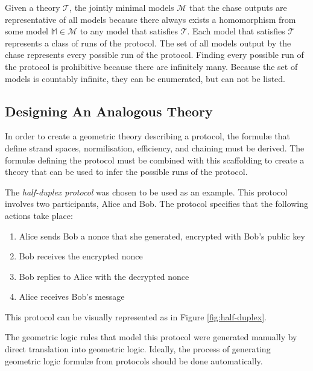 		Given a theory $\mathcal{T}$, the jointly minimal models $\mathcal{M}$
		that the chase outputs are representative of all models because there
		always exists a homomorphism from some model $\mathbb{M} \in
		\mathcal{M}$ to any model that satisfies $\mathcal{T}$. Each model that
		satisfies $\mathcal{T}$ represents a class of runs of the protocol. The
		set of all models output by the chase represents every possible run of
		the protocol. Finding every possible run of the protocol is prohibitive
		because there are infinitely many. Because the set of models is
		countably infinite, they can be enumerated, but can not be listed.

	\subsection{Designing An Analogous Theory}

		In order to create a geometric theory describing a protocol, the
		formul{\ae} that define strand spaces, normilisation, efficiency, and
		chaining must be derived. The formul{\ae} defining the protocol must be
		combined with this scaffolding to create a theory that can be used to
		infer the possible runs of the protocol.

		The \emph{half-duplex protocol} was chosen to be used as an example.
		This protocol involves two participants, Alice and Bob. The protocol
		specifies that the following actions take place:

		\begin{enumerate}
		\item Alice sends Bob a nonce that she generated, encrypted with Bob's public key
		\item Bob receives the encrypted nonce
		\item Bob replies to Alice with the decrypted nonce
		\item Alice receives Bob's message
		\end{enumerate}

		This protocol can be visually represented as in Figure \ref{fig:half-duplex}.


		The geometric logic rules that model this protocol were generated
		manually by direct translation into geometric logic. Ideally, the
		process of generating geometric logic formul{\ae} from protocols should
		be done automatically.

